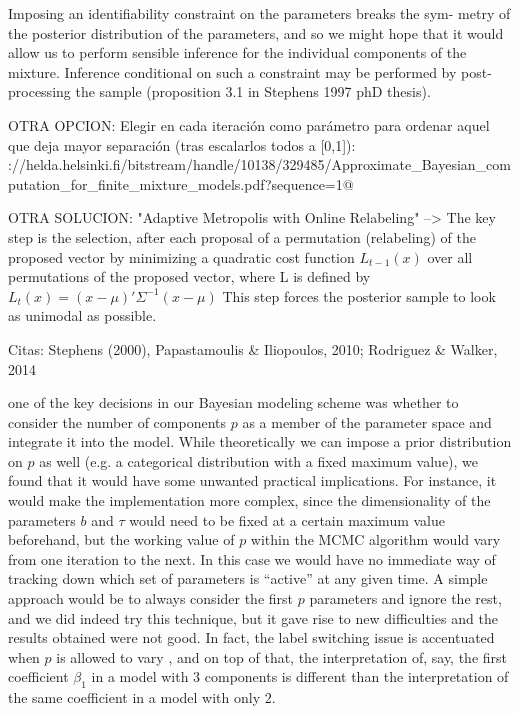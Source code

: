 \begin{outcomment}
Imposing an identifiability constraint on the parameters breaks the sym-
metry of the posterior distribution of the parameters, and so we might hope that it would allow us to perform sensible inference for the individual components of the mixture. Inference conditional on such a constraint may be performed by post-processing the sample (proposition 3.1 in Stephens 1997 phD thesis).

OTRA OPCION: Elegir en cada iteración como parámetro para ordenar aquel que deja mayor separación (tras escalarlos todos a [0,1]): \verb@https://helda.helsinki.fi/bitstream/handle/10138/329485/Approximate_Bayesian_computation_for_finite_mixture_models.pdf?sequence=1@

OTRA SOLUCION: "Adaptive Metropolis with Online Relabeling" --> The key step is the selection, after each proposal of a permutation (relabeling) of the proposed vector by minimizing a quadratic cost function
$L_{t-1} (x)$ over all permutations of the proposed vector, where L is defined by
$L_t(x) = (x - \mu)'\Sigma^{-1}(x - \mu)$
This step forces the posterior sample to look as unimodal as possible.

Citas: Stephens (2000), Papastamoulis \& Iliopoulos, 2010; Rodriguez \& Walker, 2014
\end{outcomment}

 one of the key decisions in our Bayesian modeling scheme was whether to consider the number of components \(p\) as a member of the parameter space and integrate it into the model. While theoretically we can impose a prior distribution on \(p\) as well (e.g. a categorical distribution with a fixed maximum value), we found that it would have some unwanted practical implications. For instance, it would make the implementation more complex, since the dimensionality of the parameters \(b\) and \(\tau\) would need to be fixed at a certain maximum value beforehand, but the working value of \(p\) within the MCMC algorithm would vary from one iteration to the next. In this case we would have no immediate way of tracking down which set of parameters is ``active'' at any given time. A simple approach would be to always consider the first \(p\) parameters and ignore the rest, and we did indeed try this technique, but it gave rise to new difficulties and the results obtained were not good. In fact, the label switching issue is accentuated when \(p\) is allowed to vary \citep[c.f.][Sec.~2.3]{grollemund2019bayesian}, and on top of that, the interpretation of, say, the first coefficient \(\beta_1\) in a model with \(3\) components is different than the interpretation of the same coefficient in a model with only \(2\).

